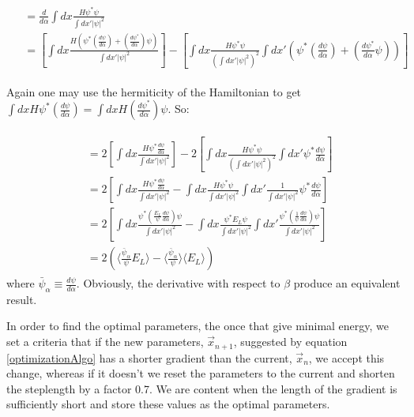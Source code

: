 \documentclass[english, a4paper]{article}
\begin{document}
	\begin{align}
	\begin{split}
	&= \frac{d}{d\alpha}\int dx \frac{H\psi^*\psi}{\int dx'|\psi|^2}\\
	&= \left[ \int dx\frac{H\left(\psi^*\left(\frac{d\psi}{d\alpha}\right) + \left(\frac{d\psi^*}{d\alpha}\right)\psi\right)}{\int dx'|\psi|^2} \right] - \left[ \int dx \frac{H\psi^*\psi}{\left(\int dx'|\psi|^2\right)^2}\int dx'\left( \psi^*\left(\frac{d\psi}{d\alpha}\right) + \left(\frac{d\psi^*}{d\alpha}\psi\right) \right) \right]
	\end{split}
	\end{align}
	
	Again one may use the hermiticity of the Hamiltonian to get $\int dx H \psi^*\left(\frac{d\psi}{d\alpha}\right) = \int dx H \left(\frac{d\psi^*}{d\alpha}\right)\psi$. So:
	
	\begin{align}
	\begin{split}
	&= 2\left[ \int dx\frac{H\psi^*\frac{d\psi}{d\alpha}}{\int dx'|\psi|^2} \right] - 2\left[ \int dx \frac{H\psi^*\psi}{\left(\int dx'|\psi|^2\right)^2}\int dx' \psi^*\frac{d\psi}{d\alpha} \right]\\
	&= 2\left[ \int dx\frac{H\psi^*\frac{d\psi}{d\alpha}}{\int dx'|\psi|^2} - \int dx \frac{H\psi^*\psi}{\int dx'|\psi|^2}\int dx' \frac{1}{\int dx'|\psi|^2}\psi^*\frac{d\psi}{d\alpha} \right]\\
	&= 2\left[ \int dx\frac{\psi^*\left(\frac{E_L}{\psi}\frac{d\psi}{d\alpha}\right) \psi}{\int dx'|\psi|^2} - \int dx \frac{\psi^* E_L\psi}{\int dx'|\psi|^2}\int dx' \frac{\psi^*\left(\frac{1}{\psi}\frac{d\psi}{d\alpha}\right)\psi}{\int dx'|\psi|^2} \right]\\
	&= 2\left( \langle\frac{\bar{\psi}_\alpha}{\psi}E_L\rangle -  \langle\frac{\bar{\psi}_\alpha}{\psi}\rangle\langle E_L\rangle \right)
	\end{split}
	\end{align}
	where $\bar{\psi}_\alpha \equiv \frac{d\psi}{d\alpha}$. Obviously, the derivative with respect to $\beta$ produce an equivalent result. 
	
	
	In order to find the optimal parameters, the once that give minimal energy, we set a criteria that if the new parameters, $\vec{x}_{n+1}$, suggested by equation \eqref{optimizationAlgo} has a shorter gradient than the current, $\vec{x}_n$, we accept this change, whereas if it doesn't we reset the parameters to the current and shorten the steplength by a factor 0.7. We are content when the length of the gradient is sufficiently short and store these values as the optimal parameters. 
	
\end{document}
